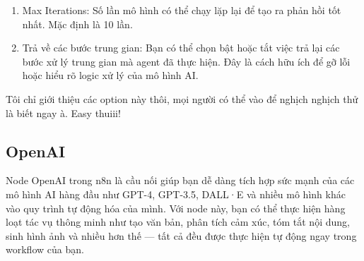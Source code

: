 \begin{enumerate}
\begin{verbatim}
{tools}

{format_instructions}

USER'S INPUT
--------------------
Đây là yêu cầu của người dùng (hãy trả lời bằng đoạn mã JSON chứa một hành động duy nhất, KHÔNG thêm nội dung khác):

{{input}}
\end{verbatim}

\textbf{System Message}

Hiểu như này cho dễ hiểu. System prompt kiểu như đặt ngữ cảnh cho con chatbot hiểu. Mem có thể nhập vào đó là hãy trả lời như một ông cụ 60 tuổi chẳng hạn. Agent nó sẽ đặt mình vào bối cảnh đó và phản hồi lại cho phù hợp. Điều này làm cho con bot hiểu rõ vai trò, giọng điệu, hoặc cách phản hồi như nào sao cho đúng ý.

Ví dụ: Hãy nói chuyện như một ông cụ 60 tuổi đang khù khụ với với người bạn hiền về cuộc sống, hãy bắt đầu

Respone: À… khụ khụ… chà… lâu lắm rồi mới có người ngồi đây hàn huyên với lão già này đấy. Ờ… cái tuổi sáu mươi rồi, sáng dậy thì lưng còng, tối đến thì đầu gối kêu răng rắc… mà vẫn ham ngồi kể chuyện xưa chuyện nay. Khụ khụ…

Này… anh bạn hiền, cậu ngồi xuống đây, rót chén trà nóng đi. Thời buổi bây giờ nhanh quá… mới hôm nào còn bẻ đôi cái bánh đa, ngồi ven sông thả câu, thế mà quay đi quay lại tóc tôi đã bạc trắng thế này rồi. Anh bạn thì sao? Dạo này cuộc sống ra sao? Ừm… có cái gì vui kể lão nghe với.

$\rightarrow$ Hãy ghê :>
    \item Max Iterations: Số lần mô hình có thể chạy lặp lại để tạo ra phản hồi tốt nhất. Mặc định là 10 lần.

    \item Trả về các bước trung gian: Bạn có thể chọn bật hoặc tắt việc trả lại các bước xử lý trung gian mà agent đã thực hiện. Đây là cách hữu ích để gỡ lỗi hoặc hiểu rõ logic xử lý của mô hình AI.
\end{enumerate}


Tôi chỉ giới thiệu các option này thôi, mọi người có thể vào để nghịch nghịch thử là biết ngay à. Easy thuiii!


\subsection{OpenAI}
Node OpenAI trong n8n là cầu nối giúp bạn dễ dàng tích hợp sức mạnh của các mô hình AI hàng đầu như GPT-4, GPT-3.5, DALL·E và nhiều mô hình khác vào quy trình tự động hóa của mình. Với node này, bạn có thể thực hiện hàng loạt tác vụ thông minh như tạo văn bản, phân tích cảm xúc, tóm tắt nội dung, sinh hình ảnh và nhiều hơn thế — tất cả đều được thực hiện tự động ngay trong workflow của bạn.

